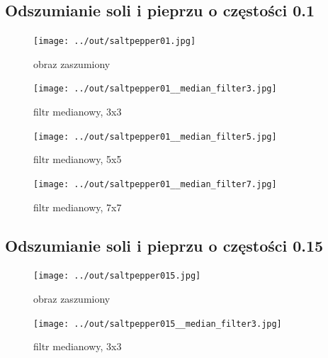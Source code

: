 \documentclass[a4paper,12pt]{article}
\begin{document}
\subsection{Odszumianie soli i pieprzu o częstości 0.1}
\begin{figure}[h!]
\begin{minipage}[t]{7.5cm}
\begin{center}
\texttt{[image: ../out/saltpepper01.jpg]}
\caption{obraz zaszumiony}
\end{center}
\end{minipage}
\hfill
\begin{minipage}[t]{7.5cm}
\begin{center}
\texttt{[image: ../out/saltpepper01\_\_median\_filter3.jpg]}
\caption{filtr medianowy, 3x3}
\end{center}
\end{minipage}
\end{figure}

\begin{figure}[h!]
\begin{minipage}[t]{7.5cm}
\begin{center}
\texttt{[image: ../out/saltpepper01\_\_median\_filter5.jpg]}
\caption{filtr medianowy, 5x5}
\end{center}
\end{minipage}
\hfill
\begin{minipage}[t]{7.5cm}
\begin{center}
\texttt{[image: ../out/saltpepper01\_\_median\_filter7.jpg]}
\caption{filtr medianowy, 7x7}
\end{center}
\end{minipage}
\end{figure}


\newpage
\subsection{Odszumianie soli i pieprzu o częstości 0.15}
\begin{figure}[h!]
\begin{minipage}[t]{7.5cm}
\begin{center}
\texttt{[image: ../out/saltpepper015.jpg]}
\caption{obraz zaszumiony}
\end{center}
\end{minipage}
\hfill
\begin{minipage}[t]{7.5cm}
\begin{center}
\texttt{[image: ../out/saltpepper015\_\_median\_filter3.jpg]}
\caption{filtr medianowy, 3x3}
\end{center}
\end{minipage}
\end{figure}
\end{document}
